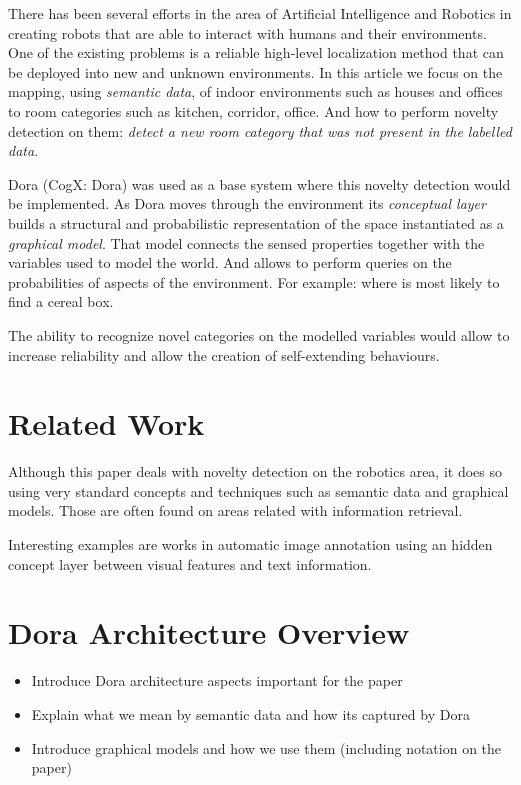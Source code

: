 \documentclass[runningheads,a4paper]{llncs}
\begin{document}
There has been several efforts in the area of Artificial Intelligence and Robotics in creating robots
that are able to interact with humans and their environments.
One of the existing problems is a reliable high-level localization method that can be deployed into new
and unknown environments.
In this article we focus on the mapping, using \emph{semantic data}, of indoor environments such as houses and offices to room categories
such as kitchen, corridor, office.
And how to perform novelty detection on them: \emph{detect a new room category that was not present in the labelled data}.

Dora\cite{dora} (CogX: Dora) was used as a base system where this novelty detection would be implemented.
As Dora moves through the environment its \emph{conceptual layer} builds a structural and probabilistic representation of the space
instantiated as a \emph{graphical model}.
That model connects the sensed properties together with the variables used to model the world.
And allows to perform queries on the probabilities of aspects of the environment.
For example: where is most likely to find a cereal box\cite{exploiting}.

The ability to recognize novel categories on the modelled variables would allow to increase
reliability and allow the creation of self-extending behaviours.


\section{Related Work}
Although this paper deals with novelty detection on the robotics area, it does so using very
standard concepts and techniques such as semantic data and graphical models.
Those are often found on areas related with information retrieval.

Interesting examples are works in automatic image annotation using an hidden concept layer between visual features and text information\cite{multi-model-image-retrieval}.

\section{Dora Architecture Overview}
\begin{itemize}
\item Introduce Dora architecture aspects important for the paper
\item Explain what we mean by semantic data and how its captured by Dora
\item Introduce graphical models and how we use them (including notation on the paper)
\end{itemize}
\end{document}
